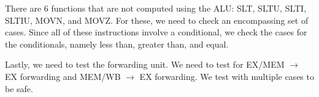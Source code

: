 \documentclass{article}
\begin{document}
There are 6 functions that are not computed using the ALU: SLT, SLTU, SLTI, SLTIU, MOVN, and MOVZ. For these, we need to check an encompassing set of cases. Since all of these instructions involve a conditional, we check the cases for the conditionals, namely less than, greater than, and equal.

Lastly, we need to test the forwarding unit. We need to test for EX/MEM $\rightarrow$ EX forwarding and MEM/WB $\rightarrow$ EX forwarding. We test with multiple cases to be safe. 
\end{document}
